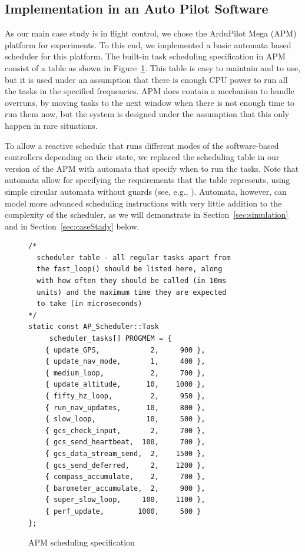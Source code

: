 \documentclass{sig-alternate-ipsn13}
\begin{document}
\subsection{Implementation in an Auto Pilot Software}
As our main case study is in flight control, we chose the ArduPilot Mega
(APM) platform for experiments. To this end, we implemented a basic automata based scheduler for this platform. The built-in task scheduling specification in APM consist of a table as shown in Figure~\ref{fig:apm-scheduler}. This table is easy to maintain and to use, but it is used under an assumption that there is enough CPU power to run all the tasks in the specified frequencies. APM does contain a mechanism to handle overruns, by moving tasks to the next window when there is not enough time to run them now, but the system is designed under the assumption that this only happen in rare situations.

To allow a reactive schedule that runs different modes of the software-based controllers depending on their state, we replaced the scheduling table in our version of the APM with automata that specify when to run the tasks. Note that automata allow for specifying the requirements that the table represents, using simple circular automata without guards (see, e.g., \cite{weiss2007automata}). Automata, however, can model more advanced scheduling instructions with very little addition to the complexity of the scheduler, as we will demonstrate in Section~\ref{sec:simulation} and in Section~\ref{sec:caseStady} below.

\begin{figure}
	\scriptsize
	\begin{lstlisting}
/*
  scheduler table - all regular tasks apart from
  the fast_loop() should be listed here, along 
  with how often they should be called (in 10ms 
  units) and the maximum time they are expected 
  to take (in microseconds)
*/
static const AP_Scheduler::Task 
     scheduler_tasks[] PROGMEM = {
	{ update_GPS,            2,     900 },
	{ update_nav_mode,       1,     400 },
	{ medium_loop,           2,     700 },
	{ update_altitude,      10,    1000 },
	{ fifty_hz_loop,         2,     950 },
	{ run_nav_updates,      10,     800 },
	{ slow_loop,            10,     500 },
	{ gcs_check_input,       2,     700 },
	{ gcs_send_heartbeat,  100,     700 },
	{ gcs_data_stream_send,  2,    1500 },
	{ gcs_send_deferred,     2,    1200 },
	{ compass_accumulate,    2,     700 },
	{ barometer_accumulate,  2,     900 },
	{ super_slow_loop,     100,    1100 },
	{ perf_update,        1000,     500 }
};
	\end{lstlisting}
	\caption{APM scheduling specification}
	\label{fig:apm-scheduler} 
\end{figure}
\end{document}
